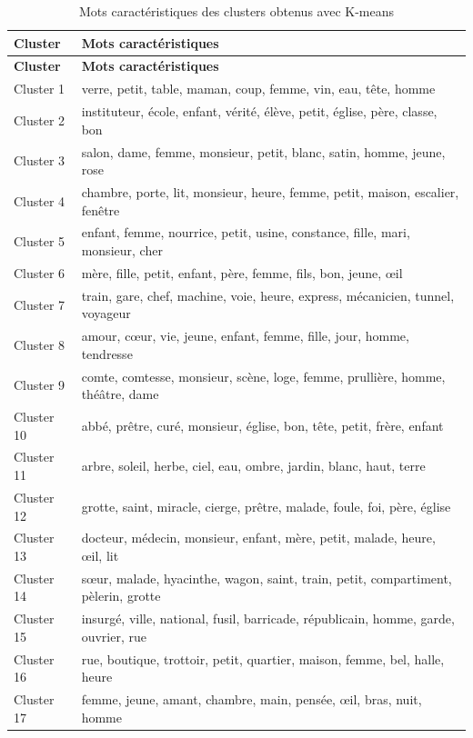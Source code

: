 \begin{longtable}{p{2cm}p{11.5cm}}
\caption{Mots caractéristiques des clusters obtenus avec K-means} \\
\toprule
\textbf{Cluster} & \textbf{Mots caractéristiques} \\
\midrule
\endfirsthead

\toprule
\textbf{Cluster} & \textbf{Mots caractéristiques} \\
\midrule
\endhead
Cluster 1 & verre, petit, table, maman, coup, femme, vin, eau, tête, homme \\
Cluster 2 & instituteur, école, enfant, vérité, élève, petit, église, père, classe, bon \\
Cluster 3 & salon, dame, femme, monsieur, petit, blanc, satin, homme, jeune, rose \\
Cluster 4 & chambre, porte, lit, monsieur, heure, femme, petit, maison, escalier, fenêtre \\
Cluster 5 & enfant, femme, nourrice, petit, usine, constance, fille, mari, monsieur, cher \\
Cluster 6 & mère, fille, petit, enfant, père, femme, fils, bon, jeune, œil \\
Cluster 7 & train, gare, chef, machine, voie, heure, express, mécanicien, tunnel, voyageur \\
Cluster 8 & amour, cœur, vie, jeune, enfant, femme, fille, jour, homme, tendresse \\
Cluster 9 & comte, comtesse, monsieur, scène, loge, femme, prullière, homme, théâtre, dame \\
Cluster 10 & abbé, prêtre, curé, monsieur, église, bon, tête, petit, frère, enfant \\
Cluster 11 & arbre, soleil, herbe, ciel, eau, ombre, jardin, blanc, haut, terre \\
Cluster 12 & grotte, saint, miracle, cierge, prêtre, malade, foule, foi, père, église \\
Cluster 13 & docteur, médecin, monsieur, enfant, mère, petit, malade, heure, œil, lit \\
Cluster 14 & sœur, malade, hyacinthe, wagon, saint, train, petit, compartiment, pèlerin, grotte \\
Cluster 15 & insurgé, ville, national, fusil, barricade, républicain, homme, garde, ouvrier, rue \\
Cluster 16 & rue, boutique, trottoir, petit, quartier, maison, femme, bel, halle, heure \\
Cluster 17 & femme, jeune, amant, chambre, main, pensée, œil, bras, nuit, homme \\

\end{longtable}
